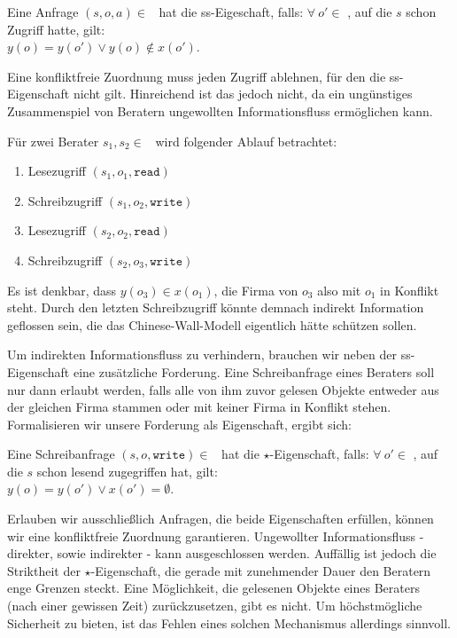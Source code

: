 \begin{definition}
	Eine Anfrage \((s, o, a) \in\) \calS \ctsProd \calO \ctsProd \calA\ hat die ss-Eigeschaft, falls: \(\forall\ o' \in\) \calO, auf die \(s\) schon Zugriff hatte, gilt:\\ \(y(o) = y(o') \lor y(o) \notin x(o')\).
\end{definition}

Eine konfliktfreie Zuordnung muss jeden Zugriff ablehnen, für den die ss-Eigenschaft nicht gilt. Hinreichend ist das jedoch nicht, da ein ungünstiges Zusammenspiel von Beratern ungewollten Informationsfluss ermöglichen kann.

\begin{beispiel}
	Für zwei Berater \(s_1, s_2 \in\) \calS\ wird folgender Ablauf betrachtet:
	\begin{multicols}{2}
		\begin{enumerate}
			\item Lesezugriff \((s_1, o_1, \texttt{read})\)
			\item Schreibzugriff \((s_1, o_2, \texttt{write})\)
			\item Lesezugriff \((s_2, o_2, \texttt{read})\)
			\item Schreibzugriff \((s_2, o_3, \texttt{write})\)
		\end{enumerate}
	\end{multicols}
	Es ist denkbar, dass \(y(o_3) \in x(o_1)\), die Firma von \(o_3\) also mit \(o_1\) in Konflikt steht. Durch den letzten Schreibzugriff könnte demnach indirekt Information geflossen sein, die das Chinese-Wall-Modell eigentlich hätte schützen sollen. 
\end{beispiel}

Um indirekten Informationsfluss zu verhindern, brauchen wir neben der ss-Eigenschaft eine zusätzliche Forderung. Eine Schreibanfrage eines Beraters soll nur dann erlaubt werden, falls alle von ihm zuvor gelesen Objekte entweder aus der gleichen Firma stammen oder mit keiner Firma in Konflikt stehen. Formalisieren wir unsere Forderung als Eigenschaft, ergibt sich:

\begin{definition}
	Eine Schreibanfrage \((s, o, \texttt{write}) \in\) \calS \ctsProd \calO\ hat die \(\star\)-Eigenschaft, falls: \(\forall\ o' \in\) \calO, auf die \(s\) schon lesend zugegriffen hat, gilt:\\ \(y(o) = y(o') \lor x(o') = \emptyset\).
\end{definition}

Erlauben wir ausschließlich Anfragen, die beide Eigenschaften erfüllen, können wir eine konfliktfreie Zuordnung garantieren. Ungewollter Informationsfluss - direkter, sowie indirekter - kann ausgeschlossen werden. Auffällig ist jedoch die Striktheit der \(\star\)-Eigenschaft, die gerade mit zunehmender Dauer den Beratern enge Grenzen steckt. Eine Möglichkeit, die gelesenen Objekte eines Beraters (nach einer gewissen Zeit) zurückzusetzen, gibt es nicht. Um höchstmögliche Sicherheit zu bieten, ist das Fehlen eines solchen Mechanismus allerdings sinnvoll.
